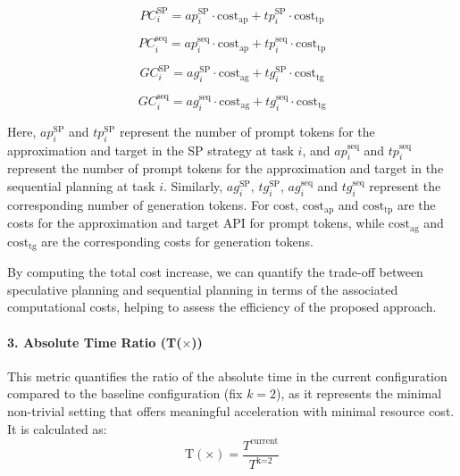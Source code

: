 \begin{equation}
    PC^{\text{SP}}_i = ap^{\text{SP}}_i \cdot \text{cost}_{\text{ap}} + tp^{\text{SP}}_i \cdot \text{cost}_{\text{tp}}
\end{equation}

\begin{equation}
    PC^{\text{seq}}_i = ap^{\text{seq}}_i \cdot \text{cost}_{\text{ap}} + tp^{\text{seq}}_i \cdot \text{cost}_{\text{tp}}
\end{equation}

\begin{equation}
    GC^{\text{SP}}_i = ag^{\text{SP}}_i \cdot \text{cost}_{\text{ag}} + tg^{\text{SP}}_i \cdot \text{cost}_{\text{tg}}
\end{equation}

\begin{equation}
    GC^{\text{seq}}_i = ag^{\text{seq}}_i \cdot \text{cost}_{\text{ag}} + tg^{\text{seq}}_i \cdot \text{cost}_{\text{tg}}
\end{equation}

Here, $ap^{\text{SP}}_i$ and $tp^{\text{SP}}_i$ represent the number of prompt tokens for the approximation and target in the SP strategy at task $i$, and $ap^{\text{seq}}_i$ and $tp^{\text{seq}}_i$ represent the number of prompt tokens for the approximation and target in the sequential planning at task $i$. Similarly, $ag^{\text{SP}}_i$, $tg^{\text{SP}}_i$, $ag^{\text{seq}}_i$ and $tg^{\text{seq}}_i$ represent the corresponding number of generation tokens. For cost, $\text{cost}_{\text{ap}}$ and $\text{cost}_{\text{tp}}$ are the costs for the approximation and target API for prompt tokens, while $\text{cost}_{\text{ag}}$ and $\text{cost}_{\text{tg}}$ are the corresponding costs for generation tokens.

By computing the total cost increase, we can quantify the trade-off between speculative planning and sequential planning in terms of the associated computational costs, helping to assess the efficiency of the proposed approach.

\paragraph{3. Absolute Time Ratio (T($\times$))} This metric quantifies the ratio of the absolute time in the current configuration compared to the baseline configuration (fix $k=2$), as it represents the minimal non-trivial setting that offers meaningful acceleration with minimal resource cost. It is calculated as:
\[
\text{T}(\times) = \frac{T^{\text{current}}}{T^{\text{k=2}}}
\]

